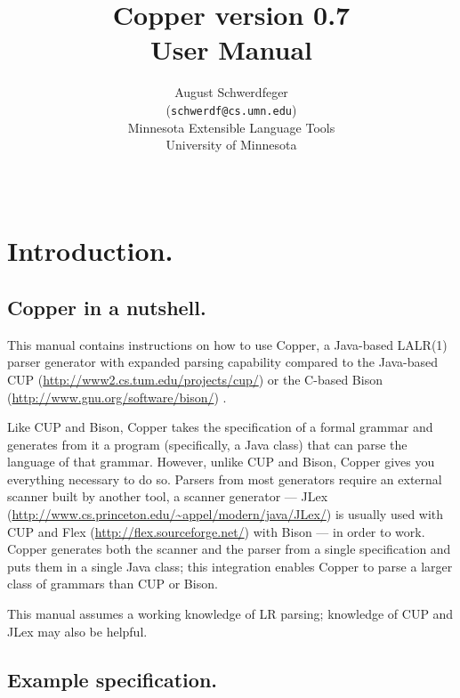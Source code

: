 \documentclass[12pt,english,twoside]{report}
\begin{document}
\title{\textbf{Copper version 0.7\\
User Manual}}


\author{August Schwerdfeger\\
(\texttt{schwerdf@cs.umn.edu})\\
Minnesota Extensible Language Tools\\
University of Minnesota}


\date{~}

\maketitle
\tableofcontents{}

\chapter{Introduction.}


\section{Copper in a nutshell.}

This manual contains instructions on how to use Copper, a Java-based
LALR(1) parser generator with expanded parsing capability compared
to the Java-based CUP (\url{http://www2.cs.tum.edu/projects/cup/})
or the C-based Bison (\url{http://www.gnu.org/software/bison/}) .

Like CUP and Bison, Copper takes the specification of a formal grammar
and generates from it a program (specifically, a Java class) that
can parse the language of that grammar. However, unlike CUP and Bison,
Copper gives you everything necessary to do so. Parsers from most
generators require an external scanner built by another tool, a scanner
generator --- JLex (\url{http://www.cs.princeton.edu/~appel/modern/java/JLex/})
is usually used with CUP and Flex (\url{http://flex.sourceforge.net/})
with Bison --- in order to work. Copper generates both the scanner
and the parser from a single specification and puts them in a single
Java class; this integration enables Copper to parse a larger class
of grammars than CUP or Bison.

This manual assumes a working knowledge of LR parsing; knowledge of
CUP and JLex may also be helpful.

\section{Example specification.}
\end{document}
